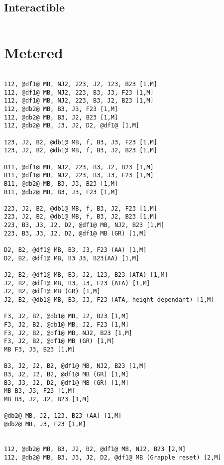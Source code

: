 \documentclass[main.tex]{subfiles}
\begin{document}
\begin{lstlisting}[language=FG]

\end{lstlisting}


\subsection{Interactible}
\begin{lstlisting}[language=FG]

\end{lstlisting}

\section{Metered}


\begin{lstlisting}[language=FG]

112, @df1@ MB, NJ2, 223, J2, 123, B23 [1,M]
112, @df1@ MB, NJ2, 223, B3, J3, F23 [1,M]
112, @df1@ MB, NJ2, 223, B3, J2, B23 [1,M]
112, @db2@ MB, B3, J3, F23 [1,M]
112, @db2@ MB, B3, J2, B23 [1,M]
112, @db2@ MB, J3, J2, D2, @df1@ [1,M]

123, J2, B2, @db1@ MB, f, B3, J3, F23 [1,M]
123, J2, B2, @db1@ MB, f, B3, J2, B23 [1,M]

B11, @df1@ MB, NJ2, 223, B3, J2, B23 [1,M]
B11, @df1@ MB, NJ2, 223, B3, J3, F23 [1,M]
B11, @db2@ MB, B3, J3, B23 [1,M]
B11, @db2@ MB, B3, J3, F23 [1,M]

223, J2, B2, @db1@ MB, f, B3, J2, F23 [1,M]
223, J2, B2, @db1@ MB, f, B3, J2, B23 [1,M]
223, B3, J3, J2, D2, @df1@ MB, NJ2, B23 [1,M]
223, B3, J3, J2, D2, @df1@ MB (GR) [1,M]

D2, B2, @df1@ MB, B3, J3, F23 (AA) [1,M]
D2, B2, @df1@ MB, B3 J3, B23(AA) [1,M]

J2, B2, @df1@ MB, B3, J2, 123, B23 (ATA) [1,M]
J2, B2, @df1@ MB, B3, J3, F23 (ATA) [1,M]
J2, B2, @df1@ MB (GR) [1,M]
J2, B2, @db1@ MB, B3, J3, F23 (ATA, height dependant) [1,M]

F3, J2, B2, @db1@ MB, J2, B23 [1,M]
F3, J2, B2, @db1@ MB, J2, F23 [1,M]
F3, J2, B2, @df1@ MB, NJ2, B23 [1,M]
F3, J2, B2, @df1@ MB (GR) [1,M]
MB F3, J3, B23 [1,M]

B3, J2, J2, B2, @df1@ MB, NJ2, B23 [1,M]
B3, J2, J2, B2, @df1@ MB (GR) [1,M]
B3, J3, J2, D2, @df1@ MB (GR) [1,M]
MB B3, J3, F23 [1,M]
MB B3, J2, J2, B23 [1,M]

@db2@ MB, J2, 123, B23 (AA) [1,M]
@db2@ MB, J3, F23 [1,M]


112, @db2@ MB, B3, J2, B2, @df1@ MB, NJ2, B23 [2,M]
112, @db2@ MB, B3, J3, J2, D2, @df1@ MB (Grapple reset) [2,M]


\end{lstlisting}
\end{document}
